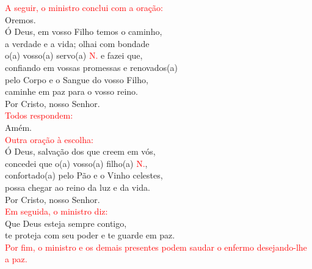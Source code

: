 \documentclass{book}
\begin{document}
\begin{flushleft}
    \textcolor{red}{A seguir, o ministro conclui com a oração:}
    \vspace{.1cm} \\
    Oremos.
    \vspace{.1cm} \\
    Ó Deus, em vosso Filho temos o caminho, \\
    a verdade e a vida; olhai com bondade \\
    o(a) vosso(a) servo(a) \textcolor{red}{N.} e fazei que, \\
    confiando em vossas promessas e renovados(a) \\
    pelo Corpo e o Sangue do vosso Filho, \\
    caminhe em paz para o vosso reino. \\
    Por Cristo, nosso Senhor.
    \vspace{.1cm} \\
    \textcolor{red}{Todos respondem:}
    \vspace{.1cm} \\
    Amém.
    \vspace{.1cm} \\
    \textcolor{red}{Outra oração à escolha:}
    \vspace{.1cm} \\
    Ó Deus, salvação dos que creem em vós, \\
    concedei que o(a) vosso(a) filho(a) \textcolor{red}{N.}, \\
    confortado(a) pelo Pão e o Vinho celestes, \\
    possa chegar ao reino da luz e da vida. \\
    Por Cristo, nosso Senhor.
    \vspace{.1cm} \\
    \textcolor{red}{Em seguida, o ministro diz:}
    \vspace{.1cm} \\
    Que Deus esteja sempre contigo, \\
    te proteja com seu poder e te guarde em paz.
    \vspace{.1cm} \\
    \textcolor{red}{Por fim, o ministro e os demais presentes podem saudar o enfermo desejando-lhe a paz.}
\end{flushleft}
\end{document}
